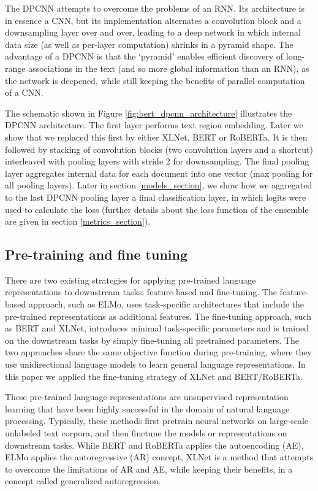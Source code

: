 \documentclass{article}
\begin{document}
The DPCNN attempts to overcome the problems of an RNN. Its architecture is in essence a CNN, but its implementation alternates a convolution block and a downsampling layer over and over, leading to a deep network in which internal data size (as well as per-layer computation) shrinks in a pyramid shape. The advantage of a DPCNN is that  the ‘pyramid’ enables efficient discovery of long-range associations in the text (and so more global information than an RNN), as the network is deepened, while still keeping the benefits of parallel computation of a CNN.

The schematic shown in Figure \ref{fig:bert_dpcnn_architecture} illustrates the DPCNN architecture. The first layer performs text region embedding. Later we show that we replaced this first by either XLNet, BERT or RoBERTa. It is then followed by stacking of convolution blocks (two convolution layers and a shortcut) interleaved with pooling layers with stride 2 for downsampling. The final pooling layer aggregates internal data for each document into one vector (max pooling for all pooling layers). Later in section \ref{models_section}, we show how we aggregated to the last DPCNN pooling layer a final classification layer, in which logits were used to calculate the loss (further details about the loss function of the ensemble are given in section \ref{metrics_section}). 

\subsection{Pre-training and fine tuning}

There are two existing strategies for applying pre-trained language representations to downstream tasks: feature-based and fine-tuning. The feature-based approach, such as ELMo\cite{deepcontextualized_word_ref}, uses task-specific architectures that include the pre-trained representations as additional features. The fine-tuning approach, such as BERT and XLNet, introduces minimal
task-specific parameters and is trained on the downstream tasks by simply fine-tuning all pretrained parameters. The two approaches share the same objective function during pre-training, where they use unidirectional language models to learn general language representations. In this paper we applied the fine-tuning strategy of XLNet and BERT/RoBERTa.

These pre-trained language representations are unsupervised representation learning that have been highly successful in the domain of natural language processing. Typically, these methods first pretrain neural networks on large-scale unlabeled text corpora, and then finetune the models or representations on downstream tasks. While BERT and RoBERTa applies the autoencoding (AE), ELMo applies the autoregressive (AR) concept, XLNet is a method that attempts to overcome the limitations of AR and AE, while keeping their benefits, in a concept called generalized autoregression.
\end{document}
